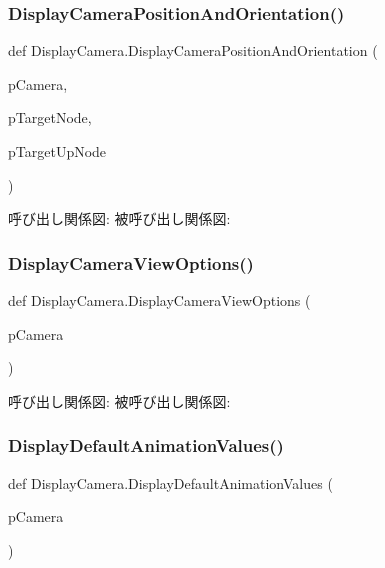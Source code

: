 \subsubsection{\texorpdfstring{Display\+Camera\+Position\+And\+Orientation()}{DisplayCameraPositionAndOrientation()}}
{\footnotesize\ttfamily def Display\+Camera.\+Display\+Camera\+Position\+And\+Orientation (\begin{DoxyParamCaption}\item[{}]{p\+Camera,  }\item[{}]{p\+Target\+Node,  }\item[{}]{p\+Target\+Up\+Node }\end{DoxyParamCaption})}

呼び出し関係図\+:
被呼び出し関係図\+:
\mbox{\label{namespace_display_camera_aba2e1c221dcfce0d6e68860ee2b8716c}} 
\subsubsection{\texorpdfstring{Display\+Camera\+View\+Options()}{DisplayCameraViewOptions()}}
{\footnotesize\ttfamily def Display\+Camera.\+Display\+Camera\+View\+Options (\begin{DoxyParamCaption}\item[{}]{p\+Camera }\end{DoxyParamCaption})}

呼び出し関係図\+:
被呼び出し関係図\+:
\mbox{\label{namespace_display_camera_a9d3a19241d1c8bbb762ae5cfd6ec29d8}} 
\subsubsection{\texorpdfstring{Display\+Default\+Animation\+Values()}{DisplayDefaultAnimationValues()}}
{\footnotesize\ttfamily def Display\+Camera.\+Display\+Default\+Animation\+Values (\begin{DoxyParamCaption}\item[{}]{p\+Camera }\end{DoxyParamCaption})}

